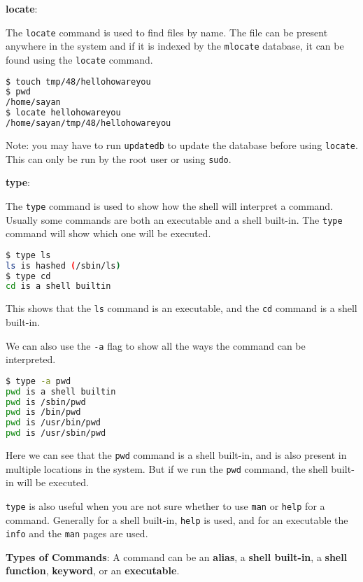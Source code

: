 \textbf{locate}:

The \lstinline|locate| command is used to find files by name.
The file can be present anywhere in the system and if it is
indexed by the \lstinline|mlocate| database, it can be found using the \lstinline|locate| command.

\begin{lstlisting}[language=bash]
$ touch tmp/48/hellohowareyou
$ pwd
/home/sayan
$ locate hellohowareyou
/home/sayan/tmp/48/hellohowareyou
\end{lstlisting}

Note: you may have to run \lstinline|updatedb| to update the database before using \lstinline|locate|.
This can only be run by the root user or using \lstinline|sudo|.

\textbf{type}:

The \lstinline|type| command is used to show how the shell will interpret a command.
Usually some commands are both an executable and a shell built-in.
The \lstinline|type| command will show which one will be executed.

\begin{lstlisting}[language=bash]
$ type ls
ls is hashed (/sbin/ls)
$ type cd
cd is a shell builtin
\end{lstlisting}

This shows that the \lstinline|ls| command is an executable, and the \lstinline|cd| command is a shell built-in.

We can also use the \lstinline|-a| flag to show all the ways the command can be interpreted.

\begin{lstlisting}[language=bash]
$ type -a pwd
pwd is a shell builtin
pwd is /sbin/pwd
pwd is /bin/pwd
pwd is /usr/bin/pwd
pwd is /usr/sbin/pwd
\end{lstlisting}

Here we can see that the \lstinline|pwd| command is a shell built-in, and is also present in multiple locations in the system.
But if we run the \lstinline|pwd| command, the shell built-in will be executed.

\lstinline|type| is also useful when you are not sure whether to use \lstinline|man| or \lstinline|help| for a command.
Generally for a shell built-in, \lstinline|help| is used, and for an executable
the \lstinline|info| and the \lstinline|man| pages are used.


\textbf{Types of Commands}:
A command can be an \textbf{alias}, a \textbf{shell built-in},
a \textbf{shell function}, \textbf{keyword},
or an \textbf{executable}.

